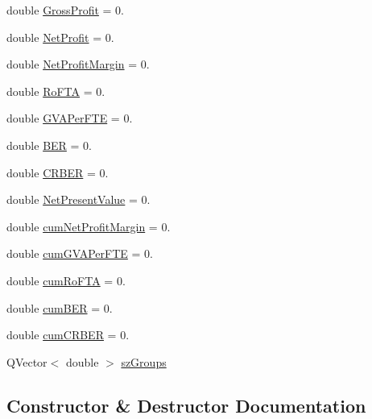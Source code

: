 \begin{DoxyCompactItemize}
\item 
double \mbox{\hyperlink{class_nation_stats_af8ed7c609a91cfa5536ab967b506755b}{Gross\+Profit}} = 0.
\item 
double \mbox{\hyperlink{class_nation_stats_a620ae8fc2f96e6d2965452dfa8936415}{Net\+Profit}} = 0.
\item 
double \mbox{\hyperlink{class_nation_stats_ab924dc97dc70060a85b3d873697d38f8}{Net\+Profit\+Margin}} = 0.
\item 
double \mbox{\hyperlink{class_nation_stats_ae2616bbc89d8bd67522144553c078f16}{Ro\+F\+TA}} = 0.
\item 
double \mbox{\hyperlink{class_nation_stats_a2b56cada4d29ac8ea3153879ce9b3e91}{G\+V\+A\+Per\+F\+TE}} = 0.
\item 
double \mbox{\hyperlink{class_nation_stats_a5f0349b5bfadcb2b3a0e1e0d3fd29a71}{B\+ER}} = 0.
\item 
double \mbox{\hyperlink{class_nation_stats_a459d377c3e020f91b31f44a51abf1c98}{C\+R\+B\+ER}} = 0.
\item 
double \mbox{\hyperlink{class_nation_stats_a1f1442b47d3f4563dfd3a93a08c9d2af}{Net\+Present\+Value}} = 0.
\item 
double \mbox{\hyperlink{class_nation_stats_a2e0340a8211efb8bcaead17c55eab776}{cum\+Net\+Profit\+Margin}} = 0.
\item 
double \mbox{\hyperlink{class_nation_stats_a755a10f3e429fee73014665aa7b6ec0f}{cum\+G\+V\+A\+Per\+F\+TE}} = 0.
\item 
double \mbox{\hyperlink{class_nation_stats_aca17816c1414a7b7172c69448c291fd4}{cum\+Ro\+F\+TA}} = 0.
\item 
double \mbox{\hyperlink{class_nation_stats_a15bba99dc9a9dcc1e66243c509b5d75e}{cum\+B\+ER}} = 0.
\item 
double \mbox{\hyperlink{class_nation_stats_a0dcbc81633a3a1de10e7ac298aec1ea4}{cum\+C\+R\+B\+ER}} = 0.
\item 
Q\+Vector$<$ double $>$ \mbox{\hyperlink{class_nation_stats_a20bb21b8af4cb890bbb47268b5d0fe5f}{sz\+Groups}}
\end{DoxyCompactItemize}


\subsection{Constructor \& Destructor Documentation}
\mbox{\label{class_nation_stats_a12f98b5e349b1ae02b8355a46216b9fa}} 
